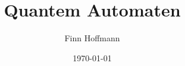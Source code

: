 \title{Quantem Automaten}
\author{Finn Hoffmann}
\date{\today}

\usepackage[utf8]{inputenc}
\usepackage[english]{babel}
\usepackage[a4paper,lmargin={3cm},rmargin={2cm},tmargin={2.5cm},bmargin = {2.5cm}]{geometry}
\usepackage{amssymb}
\usepackage{amsthm}
\usepackage{dsfont}
\usepackage{amsmath}
\usepackage{amsfonts}
\usepackage[backend=biber,style=nature,]{biblatex}
\usepackage{graphicx}
\usepackage{enumitem}


\theoremstyle{plain}
\newtheorem{theorem}{Theorem}[section]
\newtheorem{lemma}[theorem]{Lemma}
\newtheorem{corollary}[theorem]{Corollary}

\theoremstyle{definition}
\newtheorem{definition}[theorem]{Definition}
\newtheorem{example}[theorem]{Example}

\theoremstyle{remark}
\newtheorem{remark}[theorem]{Remark}




\newcommand{\N}{\mathbb{N}}
\newcommand{\Z}{\mathbb{Z}}
\newcommand{\FHE}{\textsf{FHE}}
\newcommand{\formel}{E = m \cdot c^2}